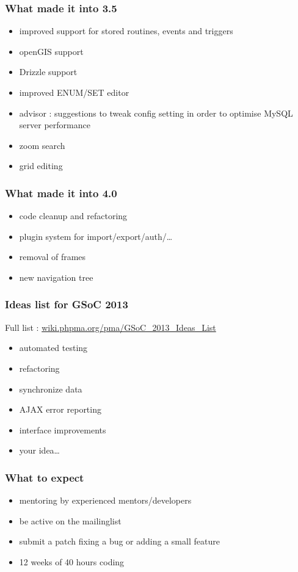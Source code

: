 \documentclass[14pt]{beamer}
\begin{document}
  \begin{frame}
    \frametitle{What made it into 3.5}
    \begin{itemize}
      \item improved support for stored routines, events and triggers
      \item openGIS support
      \item Drizzle support
      \item improved ENUM/SET editor
      \item advisor : suggestions to tweak config setting in order to optimise MySQL server performance
      \item zoom search
      \item grid editing
    \end{itemize}
  \end{frame}
  \begin{frame}
    \frametitle{What made it into 4.0}
    \begin{itemize}
      \item code cleanup and refactoring
      \item plugin system for import/export/auth/\ldots
      \item removal of frames
      \item new navigation tree
    \end{itemize}
  \end{frame}
  \begin{frame}
    \frametitle{Ideas list for GSoC 2013}
    Full list : \href{http://wiki.phpma.org/pma/GSoC\_2013\_Ideas\_List}{wiki.phpma.org/pma/GSoC\_2013\_Ideas\_List}
    \begin{itemize}
      \item automated testing
      \item refactoring
      \item synchronize data
      \item AJAX error reporting
      \item interface improvements
      \item your idea\ldots
    \end{itemize}
  \end{frame}
  \begin{frame}
    \frametitle{What to expect}
    \begin{itemize}
      \item mentoring by experienced mentors/developers
      \item be active on the mailinglist
      \item submit a patch fixing a bug or adding a small feature
      \item 12 weeks of 40 hours coding
    \end{itemize}
 \end{frame}
\end{document}
